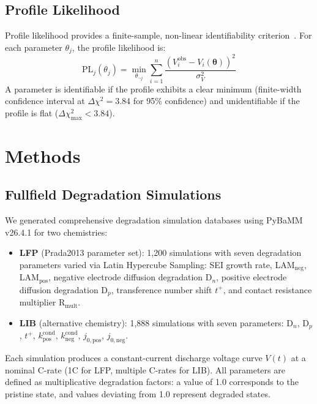 \documentclass[preprint,12pt]{elsarticle}
\begin{document}
\subsection{Profile Likelihood}
\label{sec:pl}

Profile likelihood provides a finite-sample, non-linear identifiability criterion~\cite{Raue2009}.
For each parameter $\theta_j$, the profile likelihood is:
\begin{equation}
\mathrm{PL}_j(\theta_j) = \min_{\theta_{\neg j}} \sum_{i=1}^{n} \frac{(V_i^{\mathrm{obs}} - V_i(\bm{\theta}))^2}{\sigma_V^2}
\label{eq:pl}
\end{equation}
A parameter is identifiable if the profile exhibits a clear minimum (finite-width confidence interval at $\Delta\chi^2 = 3.84$ for 95\% confidence) and unidentifiable if the profile is flat ($\Delta\chi^2_{\max} < 3.84$).

\section{Methods}
\label{sec:methods}

\subsection{Fullfield Degradation Simulations}
\label{sec:simulation}

We generated comprehensive degradation simulation databases using PyBaMM~\cite{Sulzer2019} v26.4.1 for two chemistries:

\begin{itemize}
\item \textbf{LFP} (Prada2013 parameter set): 1{,}200 simulations with seven degradation parameters varied via Latin Hypercube Sampling: SEI growth rate, LAM$_{\mathrm{neg}}$, LAM$_{\mathrm{pos}}$, negative electrode diffusion degradation D$_n$, positive electrode diffusion degradation D$_p$, transference number shift $t^+$, and contact resistance multiplier R$_{\mathrm{mult}}$.
\item \textbf{LIB} (alternative chemistry): 1{,}888 simulations with seven parameters: D$_n$, D$_p$, $t^+$, $k_{\mathrm{pos}}^{\mathrm{cond}}$, $k_{\mathrm{neg}}^{\mathrm{cond}}$, $j_{0,\mathrm{pos}}$, $j_{0,\mathrm{neg}}$.
\end{itemize}

Each simulation produces a constant-current discharge voltage curve $V(t)$ at a nominal C-rate (1C for LFP, multiple C-rates for LIB).
All parameters are defined as multiplicative degradation factors: a value of 1.0 corresponds to the pristine state, and values deviating from 1.0 represent degraded states.
\end{document}
